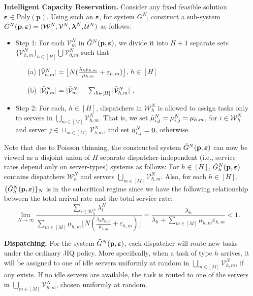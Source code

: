 \documentclass[11pt, reqno]{article}
\numberwithin{equation}{section}
\numberwithin{theorem}{section}
\begin{document}
\noindent
\textbf{Intelligent Capacity Reservation.} Consider any fixed feasible solution $\boldsymbol\varepsilon\in\mathrm{Poly}(\mathbf{p})$. 
Using such an $\boldsymbol\varepsilon$, for system $G^N$, construct a sub-system $\Tilde{G}^N(\mathbf{p},\boldsymbol\varepsilon)=(\mathcal{W}^N,\mathcal{V}^N,\boldsymbol\lambda^N,\Tilde{\mathcal{U}}^N)$ as follows: 
\begin{itemize}
    \item Step 1: For each $\mathcal{V}^N_m$ in $\Tilde{G}^N(\mathbf{p},\boldsymbol\varepsilon)$, we divide it into $H+1$ separate sets $\big\{\mathcal{V}^N_{h,m}\big\}_{h\in[H]}\bigcup \mathcal{V}^N_{0,m}$ such that\begin{itemize}
        \item[(a)]  $|\Tilde{\mathcal{V}}^N_{h,m}|=\big\lfloor N(\frac{\lambda_hp_{h,m}}{\mu_{h,m}}+\varepsilon_{h,m})\big\rfloor$, $h\in[H]$
        \item[(b)] $|\Tilde{\mathcal{V}}^N_{0,m}|=|\Tilde{\mathcal{V}}^N_m|-\sum_{h\in[H]}|\Tilde{\mathcal{V}}^N_{h,m}|$ .
    \end{itemize}
    \item Step 2: For each, $h\in[H]$, dispatchers in $\mathcal{W}^N_h$ is allowed to assign tasks only to servers in $\bigcup_{m\in[M]}\mathcal{V}^N_{h,m}$. That is, we set  $\Tilde{\mu}^N_{i,j}=\mu^N_{i,j}=\mu_{h,m}$, for $i\in\mathcal{W}^N_h$ and server $j\in\cup_{m\in[M]}\mathcal{V}^N_{h.m}$, and set $\Tilde{u}^N_{i,j}=0$, otherwise.
\end{itemize}
Note that due to Poisson thinning, the constructed system $\Tilde{G}^N(\mathbf{p},\boldsymbol\varepsilon)$ can now be viewed as a disjoint union of $H$ separate dispatcher-independent (i.e., service rates depend only on server-types) systems as follows: 
For $h\in[H]$, $\Tilde{G}^N_h(\mathbf{p},\boldsymbol\varepsilon)$ contains dispatchers $\mathcal{W}^N_h$ and servers $\bigcup_{m\in[M]}\mathcal{V}^N_{h,m}$. 
Also, for each $h\in[H]$, $
\{\Tilde{G}^N_h(\mathbf{p},\boldsymbol\varepsilon)\}_N$ is in the subcritical regime since we have the following relationship between the total arrival rate and the total service rate: $$\lim_{N\rightarrow\infty}\frac{\sum_{i\in\mathcal{W}^N_h}\lambda^N_i}{\sum_{m\in[M]}\mu_{h,m}\big\lfloor N(\frac{\lambda_hp_{h,m}}{\mu_{h,m}}+\varepsilon_{h,m})\big\rfloor}=\frac{\lambda_h}{\lambda_h+\sum_{m\in[M]}\mu_{h,m}\varepsilon_{h,m}}<1.$$

\noindent
\textbf{Dispatching.} For the system $\Tilde{G}^N(\mathbf{p},\boldsymbol\varepsilon)$, each dispatcher will route new tasks under the ordinary JIQ policy. More specifically, when a task of type $h$ arrives, it will be assigned to one of idle servers uniformly at random in $\bigcup_{m\in[M]}\mathcal{V}^N_{h,m}$, if any exists. If no idle servers are available, the task is routed to one of the servers in $\bigcup_{m\in[M]}\mathcal{V}^N_{h,m}$, chosen uniformly at random. \\
\end{document}
